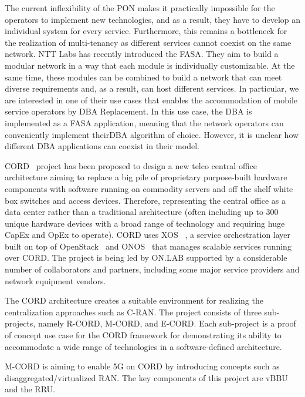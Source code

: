 The current inflexibility of the \ac{PON} makes it practically impossible for the operators to implement new technologies, and as a result, they have to develop an individual system for every service. Furthermore, this remains a bottleneck for the realization of multi-tenancy as different services cannot coexist on the same network. \ac{NTT} Labs has recently introduced the \ac{FASA}. They aim to build a modular network in a way that each module is individually customizable. At the same time, these modules can be combined to build a network that can meet diverse requirements and, as a result, can host different services. In particular, we are interested in one of their use cases that enables the accommodation of mobile service operators by \ac{DBA} Replacement. In this use case, the \ac{DBA} is implemented as a \ac{FASA} application, meaning that the network operators can conveniently implement their\ac{DBA} algorithm of choice. However, it is unclear how different \ac{DBA} applications can coexist in their model.


\ac{CORD}~\cite{7588276} project has been proposed to design a new telco central office architecture aiming to replace a big pile of proprietary purpose-built hardware components with software running on commodity servers and off the shelf white box switches and access devices. Therefore, representing the central office as a data center rather than a traditional architecture (often including up to 300 unique hardware devices with a broad range of technology and requiring huge \ac{CapEx} and \ac{OpEx} to operate). \ac{CORD} uses XOS ~\cite{XOSUnle92:online}, a service orchestration layer built on top of OpenStack~\cite{OpenStack:online} and ONOS~\cite{berde2014onos} that manages scalable services running over \ac{CORD}. The project is being led by ON.LAB supported by a considerable number of collaborators and partners, including some major service providers and network equipment vendors.

The \ac{CORD} architecture creates a suitable environment for realizing the centralization approaches such as \ac{C-RAN}. The project consists of three sub-projects, namely \ac{R-CORD}, \ac{M-CORD}, and \ac{E-CORD}. Each sub-project is a proof of concept use case for the \ac{CORD} framework for demonstrating its ability to accommodate a wide range of technologies in a software-defined architecture.

\ac{M-CORD} is aiming to enable \ac{5G} on \ac{CORD} by introducing concepts such as disaggregated/virtualized \ac{RAN}. The key components of this project are \ac{vBBU} and the \ac{RRU}.

